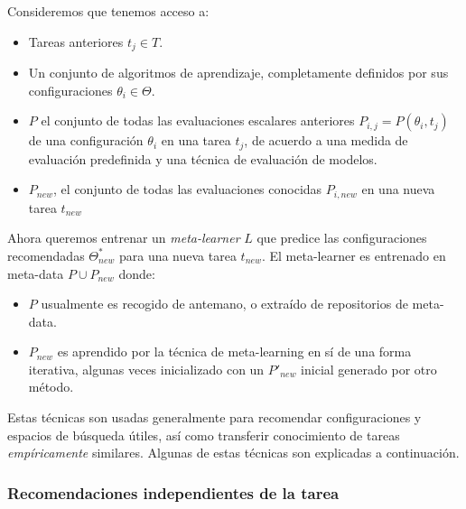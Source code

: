 \begin{definition}
Consideremos que tenemos acceso a:

\begin{itemize}
	\item Tareas anteriores $t_j \in T$.
	\item Un conjunto de algoritmos de aprendizaje, completamente definidos por sus configuraciones $\theta_i \in \Theta$.
	\item $P$ el conjunto de todas las evaluaciones escalares anteriores $P_{i,j} = P(\theta_i, t_j)$ de una configuración $\theta_i$ en una tarea $t_j$, de acuerdo a una medida de evaluación predefinida y una técnica de evaluación de modelos. 
	\item $P_{new}$, el conjunto de todas las evaluaciones conocidas $P_{i, new}$ en una nueva tarea $t_{new}$ 
\end{itemize}

Ahora queremos entrenar un \emph{meta-learner} $L$ que predice las configuraciones recomendadas $\Theta^*_{new}$ para una nueva tarea $t_{new}$. El meta-learner es entrenado en meta-data $P\cup P_{new}$ donde:

\begin{itemize}
	\item $P$ usualmente es recogido de antemano, o extraído de repositorios de meta-data.
	\item $P_{new}$ es aprendido por la técnica de meta-learning en sí de una forma iterativa, algunas veces inicializado con un $P'_{new}$ inicial generado por otro método.
\end{itemize}
\end{definition}

Estas técnicas son usadas generalmente para recomendar configuraciones y espacios de búsqueda útiles, así como transferir conocimiento de tareas \textit{empíricamente} similares. Algunas de estas técnicas son explicadas a continuación. 

\subsubsection{Recomendaciones independientes de la tarea}

